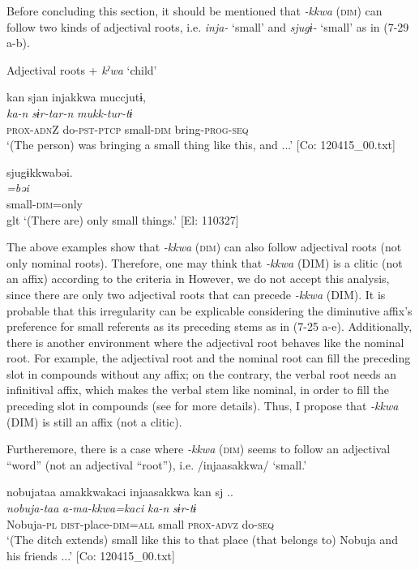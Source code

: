   Before concluding this section, it should be mentioned that \textit{{}-kkwa} (\textsc{dim}) can follow two kinds of adjectival roots, i.e. \textit{inja-} ‘small’ and \textit{sjugɨ-} ‘small’ as in (7-29 a-b).

\ea \label{ex:7:29}  Adjectival roots + \textit{kˀwa} ‘child’

\ea \label{ex:7:a}%
\glll  kan  sjan  injakkwa  muccjutɨ,\\
\textit{ka-n}  \textit{sɨr-tar-n}  \textit{}  \textit{mukk-tur-tɨ}\\
\textsc{prox}-\textsc{adn}Z  do-\textsc{pst}-\textsc{ptcp}  small-\textsc{dim}  bring-\textsc{prog}-\textsc{seq}\\
\glt ‘(The person) was bringing a small thing like this, and ...’ [Co: 120415\_00.txt]

\ex \label{ex:7:b}%
\glll  sjugɨkkwabəi.\\
\textit{=bəi}\\
small-\textsc{dim}=only\\
glt ‘(There are) only small things.’ [El: 110327]
\z
\z

The above examples show that \textit{{}-kkwa} (\textsc{dim}) can also follow adjectival roots (not only nominal roots). Therefore, one may think that \textit{{}-kkwa} (DIM) is a clitic (not an affix) according to the criteria in  However, we do not accept this analysis, since there are only two adjectival roots that can precede \textit{-kkwa} (DIM). It is probable that this irregularity can be explicable considering the diminutive affix’s preference for small referents as its preceding stems as in (7-25 a-e). Additionally, there is another environment where the adjectival root behaves like the nominal root. For example, the adjectival root and the nominal root can fill the preceding slot in compounds without any affix; on the contrary, the verbal root needs an infinitival affix, which makes the verbal stem like nominal, in order to fill the preceding slot in compounds (see  for more details). Thus, I propose that \textit{{}-kkwa} (DIM) is still an affix (not a clitic).

Furtheremore, there is a case where \textit{{}-kkwa} (\textsc{dim}) seems to follow an adjectival “word” (not an adjectival “root”), i.e. /injaasakkwa/ ‘small.’

\ea \label{ex:7:30}  %
\glll  nobujataa  amakkwakaci  injaasakkwa  kan  sj ..\\
\textit{nobuja-taa}  \textit{a-ma-kkwa=kaci}  \textit{}  \textit{ka-n}  \textit{sɨr-tɨ}\\
Nobuja-\textsc{pl}  \textsc{dist}-place-\textsc{dim}=\textsc{all}  small  \textsc{prox}-\textsc{advz}  do-\textsc{seq}\\
\glt ‘(The ditch extends) small like this to that place (that belongs to) Nobuja and his friends ...’ [Co: 120415\_00.txt]
\z

